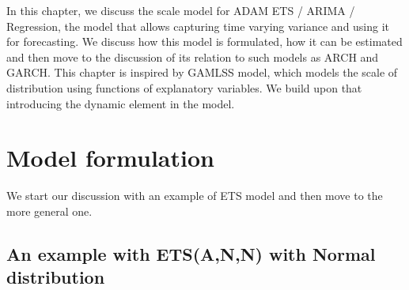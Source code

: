 \documentclass[
]{book}
\theoremstyle{definition}
\theoremstyle{definition}
\theoremstyle{definition}
\theoremstyle{definition}
\theoremstyle{remark}
\begin{document}
In this chapter, we discuss the scale model for ADAM ETS / ARIMA / Regression, the model that allows capturing time varying variance and using it for forecasting. We discuss how this model is formulated, how it can be estimated and then move to the discussion of its relation to such models as ARCH and GARCH. This chapter is inspired by GAMLSS model, which models the scale of distribution using functions of explanatory variables. We build upon that introducing the dynamic element in the model.

\hypertarget{model-formulation-1}{%
\section{Model formulation}\label{model-formulation-1}}

We start our discussion with an example of ETS model and then move to the more general one.

\hypertarget{an-example-with-etsann-with-normal-distribution}{%
\subsection{An example with ETS(A,N,N) with Normal distribution}\label{an-example-with-etsann-with-normal-distribution}}
\end{document}
